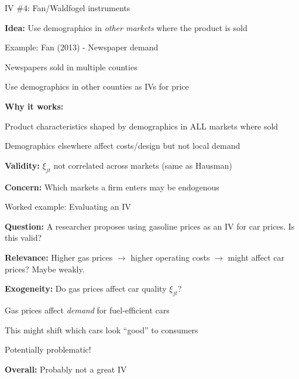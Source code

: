 \documentclass[notes,11pt, aspectratio=169]{beamer}
\newenvironment{wideitemize}{\itemize\addtolength{\itemsep}{10pt}}{\enditemize}
\begin{document}
\begin{frame}{IV \#4: Fan/Waldfogel instruments}
	\begin{wideitemize}
		\item \textbf{Idea:} Use demographics in \textit{other markets} where the product is sold
		\item Example: Fan (2013) - Newspaper demand
		\begin{wideitemize}
			\vspace{3pt}
			\item Newspapers sold in multiple counties
			\item Use demographics in other counties as IVs for price
		\end{wideitemize} \pause
		\item \textbf{Why it works:}
		\begin{wideitemize}
			\vspace{3pt}
			\item Product characteristics shaped by demographics in ALL markets where sold
			\item Demographics elsewhere affect costs/design but not local demand
		\end{wideitemize}
		\item \textbf{Validity:} $\xi_{jt}$ not correlated across markets (same as Hausman)
		\item \textbf{Concern:} Which markets a firm enters may be endogenous
	\end{wideitemize}
\end{frame}

\begin{frame}{Worked example: Evaluating an IV}
	\begin{wideitemize}
		\item \textbf{Question:} A researcher proposes using gasoline prices as an IV for car prices. Is this valid?
		\pause
		\item \textbf{Relevance:} Higher gas prices $\rightarrow$ higher operating costs $\rightarrow$ might affect car prices? Maybe weakly.
		\item \textbf{Exogeneity:} Do gas prices affect car quality $\xi_{jt}$?
		\begin{wideitemize}
			\vspace{3pt}
			\item Gas prices affect \textit{demand} for fuel-efficient cars
			\item This might shift which cars look ``good'' to consumers
			\item Potentially problematic!
		\end{wideitemize}
		\item \textbf{Overall:} Probably not a great IV
	\end{wideitemize}
\end{frame}
\end{document}
